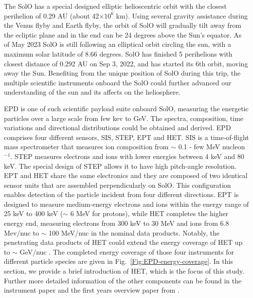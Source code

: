 The \ac{SolO} has a special designed elliptic helioscentric orbit with the closest perihelion of 0.29 AU (about 42$\times10^6$ km). Using several gravity assistance during the Venus flyby and Earth flyby, the orbit of \ac{SolO} will gradually tilt away from the ecliptic plane and in the end can be 24 degrees above the Sun's equator. As of May 2023 \ac{SolO} is still following an elliptical orbit circling the sun, with a maximum solar latitude of 8.66 degrees. \ac{SolO} has finished 5 perihelions with closest distance of 0.292 AU on Sep 3, 2022, and has started its 6th orbit, moving away the Sun. Benefiting from the unique position of \ac{SolO} during this trip, the multiple scientific instruments onboard the \ac{SolO} could further advanced our understanding of the sun and its affects on the heliosphere.

\ac{EPD} \citep{RodriguezPacheco-2019-EPD} is one of such scientific payload suite onboard \ac{SolO}, measuring the energetic particles over a large scale from few kev to GeV. The spectra, composition, time variations and directional distributions could be obtained and derived.
\ac{EPD} comprises four different sensors, \ac{SIS}, \ac{STEP}, \ac{EPT} and \ac{HET}. 
\ac{SIS} is a time-of-flight mass spectrometer that measures ion composition from $\sim$ 0.1 - few MeV nucleon$^{-1}$. \ac{STEP} measures electrons and ions with lower energies between 4 keV and 80 keV. The special design of \ac{STEP} allows it to have high pitch-angle resolution.
\ac{EPT} and \ac{HET} share the same electronics and they are composed of two identical sensor units that are assembled perpendicularly on \ac{SolO}. This configuration enables detection of the particle incident from four different directions. \ac{EPT} is designed to measure medium-energy electrons and ions within the energy range of 25 keV to 400 keV ($\sim$ 6 MeV for protons), while \ac{HET} completes the higher energy end, measuring electrons from 300 keV to 30 MeV and ions from 6.8 Mev/nuc to $\sim$ 100 MeV/nuc in the nominal data products. Notably, the penetrating data products of \ac{HET} could extend the energy coverage of \ac{HET} up to $\sim$ GeV/nuc \citep{Elftmann-2020-PhD}.
The completed energy coverage of those four instruments for different particle species are given in Fig.~\ref{Fig:EPD-energy-coverage}.
In this section, we provide a brief introduction of \ac{HET}, which is the focus of this study. Further more detailed information of the other components can be found in the instrument paper \citet{RodriguezPacheco-2019-EPD} and the first years overview paper from \citet{Wimmer2021AA}.



